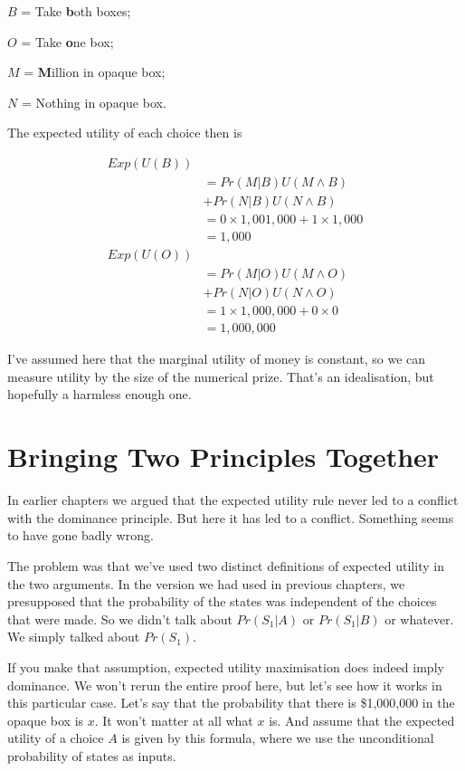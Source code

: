 \begin{itemize*}
\item $B$ = Take \textbf{b}oth boxes;
\item $O$ = Take \textbf{o}ne box;
\item $M$ = \textbf{M}illion in opaque box;
\item $N$ = Nothing in opaque box.
\end{itemize*}
The expected utility of each choice then is

\begin{align*}
Exp(U(B)) \\
&= Pr(M | B)U(M \wedge B)\\
&+ Pr(N | B)U(N \wedge B) \\
 &= 0 \times 1,001,000 + 1 \times 1,000 \\
 &= 1,000 \\
Exp(U(O)) \\
&= Pr(M | O)U(M \wedge O)\\
&+ Pr(N | O)U(N \wedge O) \\
 &= 1 \times 1,000,000 + 0 \times 0 \\
 &= 1,000,000
 \end{align*}

I've assumed here that the marginal utility of money is constant, so we can measure utility by the size of the numerical prize. That's an idealisation, but hopefully a harmless enough one.

\section{Bringing Two Principles Together}
In earlier chapters we argued that the expected utility rule never led to a conflict with the dominance principle. But here it has led to a conflict. Something seems to have gone badly wrong.

The problem was that we've used two distinct definitions of expected utility in the two arguments. In the version we had used in previous chapters, we presupposed that the probability of the states was independent of the choices that were made. So we didn't talk about $Pr(S_1|A)$ or $Pr(S_1|B)$ or whatever. We simply talked about $Pr(S_1)$.

If you make that assumption, expected utility maximisation does indeed imply dominance. We won't rerun the entire proof here, but let's see how it works in this particular case. Let's say that the probability that there is \$1,000,000 in the opaque box is $x$. It won't matter at all what $x$ is. And assume that the expected utility of a choice $A$ is given by this formula, where we use the unconditional probability of states as inputs.


